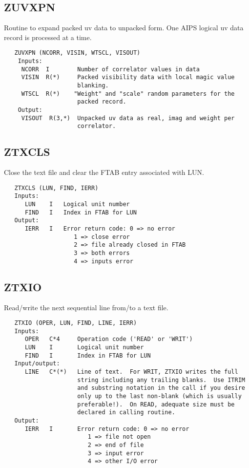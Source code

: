 \subsection{ZUVXPN}
Routine to expand packed uv data to unpacked form.  One AIPS
logical uv data record is processed at a time.
\begin{verbatim}
   ZUVXPN (NCORR, VISIN, WTSCL, VISOUT)
    Inputs:
     NCORR  I        Number of correlator values in data
     VISIN  R(*)     Packed visibility data with local magic value
                     blanking.
     WTSCL  R(*)    "Weight" and "scale" random parameters for the
                     packed record.
    Output:
     VISOUT  R(3,*)  Unpacked uv data as real, imag and weight per
                     correlator.
\end{verbatim}

\subsection{ZTXCLS}
Close the text file and clear the FTAB entry associated with LUN.
\begin{verbatim}
   ZTXCLS (LUN, FIND, IERR)
   Inputs:
      LUN    I   Logical unit number
      FIND   I   Index in FTAB for LUN
   Output:
      IERR   I   Error return code: 0 => no error
                    1 => close error
                    2 => file already closed in FTAB
                    3 => both errors
                    4 => inputs error
\end{verbatim}

\subsection{ZTXIO}
Read/write the next sequential line from/to a  text file.
\begin{verbatim}
   ZTXIO (OPER, LUN, FIND, LINE, IERR)
   Inputs:
      OPER   C*4     Operation code ('READ' or 'WRIT')
      LUN    I       Logical unit number
      FIND   I       Index in FTAB for LUN
   Input/output:
      LINE   C*(*)   Line of text.  For WRIT, ZTXIO writes the full
                     string including any trailing blanks.  Use ITRIM
                     and substring notation in the call if you desire
                     only up to the last non-blank (which is usually
                     preferable!).  On READ, adequate size must be
                     declared in calling routine.
   Output:
      IERR   I       Error return code: 0 => no error
                        1 => file not open
                        2 => end of file
                        3 => input error
                        4 => other I/O error
\end{verbatim}


